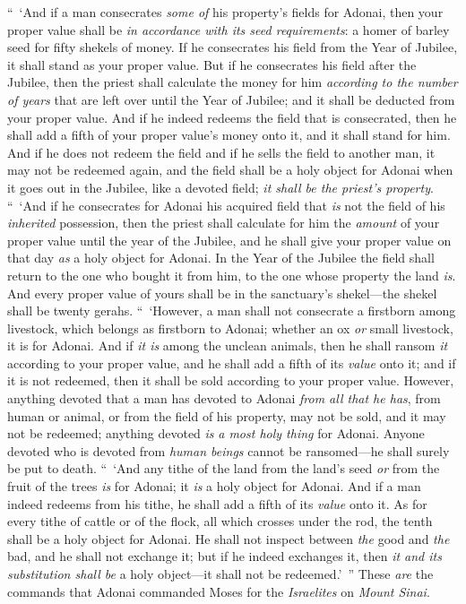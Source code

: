 \begin{biblechapter}
\verse “ ‘And if a man consecrates \textit{some of} his property’s fields for Adonai, then your proper value shall be \textit{in accordance with its seed requirements}: a homer of barley seed for fifty shekels of money.
\verse If he consecrates his field from the Year of Jubilee, it shall stand as your proper value.
\verse But if he consecrates his field after the Jubilee, then the priest shall calculate the money for him \textit{according to the number of years} that are left over until the Year of Jubilee; and it shall be deducted from your proper value.
\verse And if he indeed redeems the field that is consecrated, then he shall add a fifth of your proper value’s money onto it, and it shall stand for him.
\verse And if he does not redeem the field and if he sells the field to another man, it may not be redeemed again,
\verse and the field shall be a holy object for Adonai when it goes out in the Jubilee, like a devoted field; \textit{it shall be the priest’s property}.
\verse “ ‘And if he consecrates for Adonai his acquired field that \textit{is} not the field of his \textit{inherited} possession,
\verse then the priest shall calculate for him the \textit{amount} of your proper value until the year of the Jubilee, and he shall give your proper value on that day \textit{as} a holy object for Adonai.
\verse In the Year of the Jubilee the field shall return to the one who bought it from him, to the one whose property the land \textit{is}.
\verse And every proper value of yours shall be in the sanctuary’s shekel—the shekel shall be twenty gerahs.
\verse “ ‘However, a man shall not consecrate a firstborn among livestock, which belongs as firstborn to Adonai; whether an ox \textit{or} small livestock, it is for Adonai.
\verse And if \textit{it is} among the unclean animals, then he shall ransom \textit{it} according to your proper value, and he shall add a fifth of its \textit{value} onto it; and if it is not redeemed, then it shall be sold according to your proper value.
\verse However, anything devoted that a man has devoted to Adonai \textit{from all that he has}, from human or animal, or from the field of his property, may not be sold, and it may not be redeemed; anything devoted \textit{is} \textit{a most holy thing} for Adonai.
\verse Anyone devoted who is devoted from \textit{human beings} cannot be ransomed—he shall surely be put to death.
\verse “ ‘And any tithe of the land from the land’s seed \textit{or} from the fruit of the trees \textit{is} for Adonai; it \textit{is} a holy object for Adonai.
\verse And if a man indeed redeems from his tithe, he shall add a fifth of its \textit{value} onto it.
\verse As for every tithe of cattle or of the flock, all which crosses under the rod, the tenth shall be a holy object for Adonai.
\verse He shall not inspect between \textit{the} good and \textit{the} bad, and he shall not exchange it; but if he indeed exchanges it, then \textit{it and its substitution shall be} a holy object—it shall not be redeemed.’ ”
\verse These \textit{are} the commands that Adonai commanded Moses for the \textit{Israelites} on \textit{Mount Sinai}.
\end{biblechapter}

